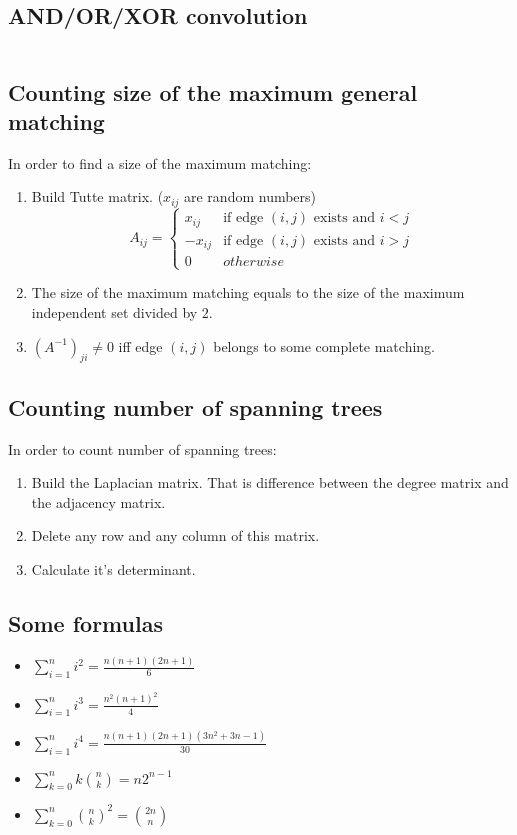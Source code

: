 \documentclass{article}
\begin{document}
\subsection{AND/OR/XOR convolution}
\inputminted[mathescape, breaklines, breakafter=(, tabsize=2, frame=lines, showtabs, tab=|\ , tabcolor=lightgray]{c++}{./numeric/convolutions/convolutions.cpp}
\subsection{Counting size of the maximum general matching}
In order to find a size of the maximum matching:
\begin{enumerate}
	\item Build Tutte matrix. ($x_{ij}$ are random numbers)
	$$A_{ij} = 
	\begin{cases} 
	x_{ij} & \text{if edge $(i, j)$ exists and $i < j$} \\
	-x_{ij} & \text{if edge $(i, j)$ exists and $i > j$} \\
	0 & otherwise
	\end{cases}$$
	\item The size of the maximum matching equals to the size of the maximum independent set divided by $2$.
	\item $(A^{-1})_{ji} \neq 0$ iff edge $(i, j)$ belongs to some complete matching.
\end{enumerate}
\subsection{Counting number of spanning trees}
In order to count number of spanning trees:
\begin{enumerate}
	\item Build the Laplacian matrix. That is difference between the degree matrix and the adjacency matrix.
	\item Delete any row and any column of this matrix.
	\item Calculate it's determinant.
\end{enumerate}
\subsection{Some formulas}
\begin{itemize}
\item $\sum\limits_{i = 1}^{n} i^2 = \frac{n(n + 1)(2n + 1)}{6}$
\item $\sum\limits_{i = 1}^{n} i^3 = \frac{n^2(n + 1)^2}{4}$
\item $\sum\limits_{i = 1}^{n} i^4 = \frac{n(n + 1)(2n + 1)(3n^2 + 3n - 1)}{30}$
\item $\sum\limits_{k = 0}^{n} k \binom{n}{k} = n 2^{n - 1}$
\item $\sum\limits_{k = 0}^{n} \binom{n}{k}^2 = \binom{2n}{n}$
\end{itemize}
\end{document}
